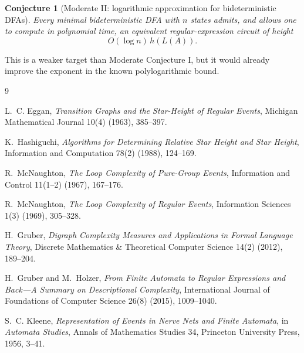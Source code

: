 \documentclass[11pt]{article}
\newtheorem{conjecture}{Conjecture}
\begin{document}
\begin{conjecture}[Moderate II: logarithmic approximation for bideterministic DFAs]
Every minimal bideterministic DFA with $n$ states admits, and allows one to
compute in polynomial time, an equivalent regular-expression circuit of
height
\[
 O(\log n)\,h(L(A)).
\]
\end{conjecture}

This is a weaker target than Moderate Conjecture I, but it would already
improve the exponent in the known polylogarithmic bound.


\begin{thebibliography}{9}

L.~C. Eggan,
\emph{Transition Graphs and the Star-Height of Regular Events},
Michigan Mathematical Journal 10(4) (1963), 385--397.

K.~Hashiguchi,
\emph{Algorithms for Determining Relative Star Height and Star Height},
Information and Computation 78(2) (1988), 124--169.

R.~McNaughton,
\emph{The Loop Complexity of Pure-Group Events},
Information and Control 11(1--2) (1967), 167--176.

R.~McNaughton,
\emph{The Loop Complexity of Regular Events},
Information Sciences 1(3) (1969), 305--328.

H.~Gruber,
\emph{Digraph Complexity Measures and Applications in Formal Language
Theory},
Discrete Mathematics \& Theoretical Computer Science 14(2) (2012),
189--204.

H.~Gruber and M.~Holzer,
\emph{From Finite Automata to Regular Expressions and Back---A Summary on
Descriptional Complexity},
International Journal of Foundations of Computer Science 26(8) (2015),
1009--1040.

S.~C. Kleene,
\emph{Representation of Events in Nerve Nets and Finite Automata},
in \emph{Automata Studies}, Annals of Mathematics Studies 34,
Princeton University Press, 1956, 3--41.

\end{thebibliography}
\end{document}
